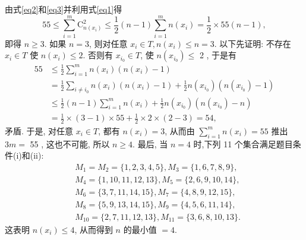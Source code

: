 由式\ref{eq2}和\ref{eq3}并利用式\ref{eq1}得
$$
55 \leqslant \sum_{i=1}^m \mathrm{C}_{n\left(x_i\right)}^2 \leqslant \frac{1}{2}(n-1) \sum_{i=1}^m n\left(x_i\right)=\frac{1}{2} \times 55(n-1),
$$
即得 $n \geqslant 3$.
如果 $n=3$, 则对任意 $x_i \in T, n\left(x_i\right) \leqslant n=3$.
以下先证明: 不存在 $x_i \in T$ 使 $n\left(x_i\right) \leqslant 2$. 否则有 $x_{i_0} \in T$, 使 $n\left(x_{i_0}\right) \leqslant$ 2 , 于是有
$$
\begin{aligned}
55 & \leqslant \frac{1}{2} \sum_{i=1}^m n\left(x_i\right)\left(n\left(x_i\right)-1\right) \\
& =\frac{1}{2} \sum_{i \neq i_0} n\left(x_i\right)\left(n\left(x_i\right)-1\right)+\frac{1}{2} n\left(x_{i_0}\right)\left(n\left(x_{i_0}\right)-1\right) \\
& \leqslant \frac{1}{2}(n-1) \sum_{i=1}^m n\left(x_i\right)+\frac{1}{2} n\left(x_{i_0}\right)\left(n\left(x_{i_0}\right)-n\right) \\
& =\frac{1}{2} \times(3-1) \times 55+\frac{1}{2} \times 2 \times(2-3)=54,
\end{aligned}
$$
矛盾.
于是, 对任意 $x_i \in T$, 都有 $n\left(x_i\right)=3$, 从而由 $\sum_{i=1}^m n\left(x_i\right)=55$ 推出 $3 m=$ 55 , 这也不可能, 所以 $n \geqslant 4$.
最后, 当 $n=4$ 时,下列 11 个集合满足题目条件(i)和(ii):
$$
\begin{aligned}
& M_1=M_2=\{1,2,3,4,5\}, M_3=\{1,6,7,8,9\}, \\
& M_4=\{1,10,11,12,13\}, M_5=\{2,6,9,10,14\}, \\
& M_6=\{3,7,11,14,15\}, M_7=\{4,8,9,12,15\}, \\
& M_8=\{5,9,13,14,15\}, M_9=\{4,5,6,11,14\}, \\
& M_{10}=\{2,7,11,12,13\}, M_{11}=\{3,6,8,10,13\} .
\end{aligned}
$$
这表明 $n\left(x_i\right) \leqslant 4$, 从而得到 $n$ 的最小值 $=4$.



